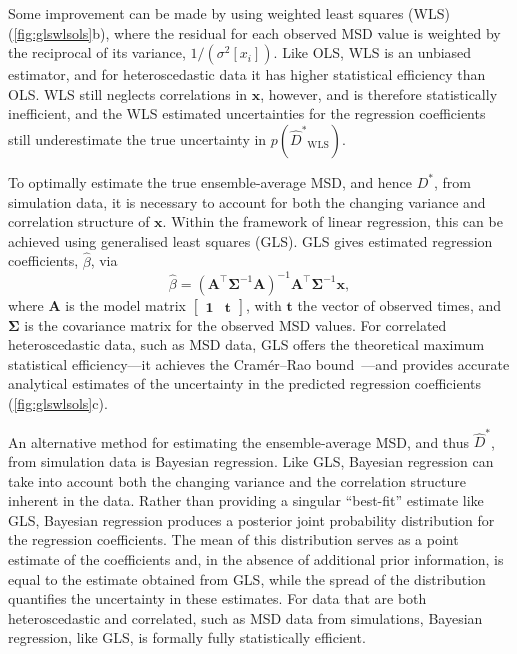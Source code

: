 \documentclass[reprint,superscriptaddress,nobibnotes,amsmath,amssymb,aps,prx,hidelinks]{revtex4-2}
\newcommand{\oMSD}{\ensuremath{\bm{x}}}
\newcommand{\oMSDi}{\ensuremath{x_i}}
\newcommand{\modelmatrix}{\mathbf{A}}
\newcommand{\prob}[1]{\ensuremath{p(#1)}}
\newcommand{\Dest}{\ensuremath{\widehat{D}^*}}
\newcommand{\D}{\ensuremath{D^*}}
\newcommand{\var}[1]{\ensuremath{\sigma^2[#1]}}
\begin{document}
Some improvement can be made by using weighted least squares (WLS) (\cref{fig:glswlsols}b), where the residual for each observed MSD value is weighted by the reciprocal of its variance, $1/(\var{\oMSDi})$.
Like OLS, WLS is an unbiased estimator, and for heteroscedastic data it has higher statistical efficiency than OLS.
WLS still neglects correlations in $\oMSD$, however, and is therefore statistically inefficient, and the WLS estimated uncertainties for the regression coefficients still underestimate the true uncertainty in $\prob{\Dest_\mathrm{WLS}}$.

To optimally estimate the true ensemble-average MSD, and hence $\D$, from simulation data, it is necessary to account for both the changing variance and correlation structure of $\oMSD$.
Within the framework of linear regression, this can be achieved using generalised least squares (GLS).
GLS gives estimated regression coefficients, $\widehat{\beta}$, via
\begin{equation}
    \widehat{\beta} = \left(\modelmatrix^{\top}\mathbf{\Sigma}^{-1}\modelmatrix\right)^{-1}\modelmatrix^{\top}\mathbf{\Sigma}^{-1}\oMSD,
    \label{equ:gls}
\end{equation} 
where $\modelmatrix$ is the model matrix $\begin{bmatrix}\mathbf{1} & \bm{t}\end{bmatrix}$, with $\bm{t}$ the vector of observed times, and $\mathbf{\Sigma}$ is the covariance matrix for the observed MSD values.
For correlated heteroscedastic data, such as MSD data, GLS offers the theoretical maximum statistical efficiency---it achieves the Cram\'er--Rao bound~\cite{cramer_mathematical_1946,rao_information_1945,rao_selected_1994,darmois_sur_1945,aitken_on_1942}---and provides accurate analytical estimates of the uncertainty in the predicted regression coefficients (\cref{fig:glswlsols}c).

An alternative method for estimating the ensemble-average MSD, and thus $\Dest$, from simulation data is Bayesian regression.
Like GLS, Bayesian regression can take into account both the changing variance and the correlation structure inherent in the data.
Rather than providing a singular ``best-fit'' estimate like GLS, Bayesian regression produces a posterior joint probability distribution for the regression coefficients.
The mean of this distribution serves as a point estimate of the coefficients and, in the absence of additional prior information, is equal to the estimate obtained from GLS, while the spread of the distribution quantifies the uncertainty in these estimates.
For data that are both heteroscedastic and correlated, such as MSD data from simulations, Bayesian regression, like GLS, is formally fully statistically efficient.
\end{document}
